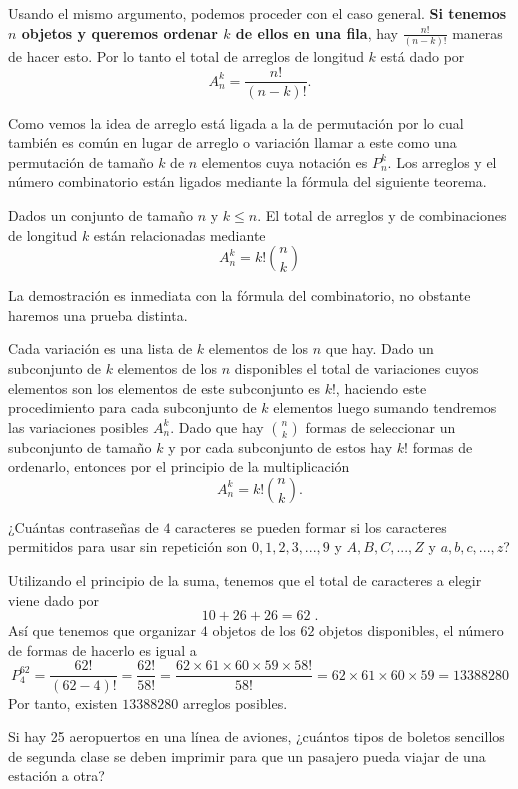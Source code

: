 Usando el mismo argumento, podemos proceder con el caso general. \textbf{Si tenemos $n$ objetos y queremos ordenar $k$ de ellos en una fila}, hay $\displaystyle\frac{n!}{(n-k)!}$ maneras de hacer esto. Por lo tanto el total de arreglos de longitud $k$ está dado por $$A_n^k = \dfrac{n!}{(n-k)!}.$$

Como vemos la idea de arreglo está ligada a la de permutación por lo cual también es común en lugar de arreglo o variación llamar a este como una permutación de tamaño $k$ de $n$ elementos cuya notación es $P_n^k$. Los arreglos y el número combinatorio están ligados mediante la fórmula del siguiente teorema.

\begin{teorema}
    Dados un conjunto de tamaño $n$ y $k\leq n$. El total de arreglos y de combinaciones de longitud $k$ están relacionadas mediante $$A_n^k=k! \binom{n}{k}$$ 
\end{teorema}

\begin{demostracion}
    La demostración es inmediata con la fórmula del combinatorio, no obstante haremos una prueba distinta.

    Cada variación es una lista de $k$ elementos de los $n$ que hay. Dado un subconjunto de $k$ elementos de los $n$ disponibles el total de variaciones cuyos elementos son los elementos de este subconjunto es $k!$, haciendo este procedimiento para cada subconjunto de $k$ elementos luego sumando tendremos las variaciones posibles $A_n^k$. Dado que hay $\displaystyle\binom{n}{k}$ formas de seleccionar un subconjunto de tamaño $k$ y por cada subconjunto de estos hay $k!$ formas de ordenarlo, entonces por el principio de la multiplicación $$A_n^k=k! \binom{n}{k}.$$
\end{demostracion}

\begin{ejemplo}
    ¿Cuántas contraseñas de $4$ caracteres se pueden formar si los caracteres permitidos para usar sin repetición son $0, 1, 2, 3, ..., 9$ y $A, B, C, ..., Z$ y $a, b, c, ..., z$?
\end{ejemplo}
\begin{solucion}
    Utilizando el principio de la suma, tenemos que el total de caracteres a elegir viene dado por
    \[10+26+26=62\;.\]
    Así que tenemos que organizar $4$ objetos de los $62$ objetos disponibles, el número de formas de hacerlo es igual a
    \[P^{62}_4=\frac{62!}{(62-4)!}=\frac{62!}{58!}=\frac{62\times 61\times 60\times 59\times 58!}{58!}=62\times 61\times 60\times 59=13388280\]
    Por tanto, existen $13388280$ arreglos posibles.
\end{solucion}
\begin{ejemplo}
Si hay 25 aeropuertos en una línea de aviones, ¿cuántos tipos de boletos sencillos de segunda clase se deben imprimir para que un pasajero pueda viajar de una estación a otra?
\end{ejemplo}

